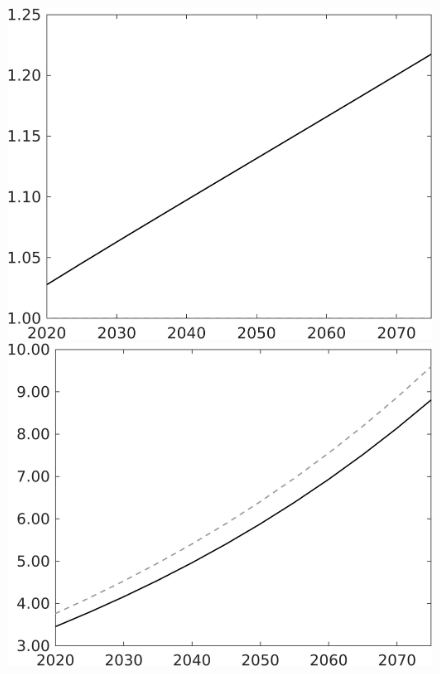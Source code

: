 \documentclass[12pt]{article}
\begin{document}
\begin{figure}[h!!]
\begin{minipage}[]{0.32\textwidth}
	\end{minipage}	
	\begin{minipage}[]{0.32\textwidth}
		\includegraphics[width=1\textwidth]{../../codding_model/own_basedOnFried/optimalPol_010922_revision/figures/all_13Sept22/CompTaul_Equlab_LFBAU_Reg0_lambdaa_spillover0_nsk1_xgr0_knspil0_sep1_countec0_GovRev0_etaa0.79_lgd0.png}
	\end{minipage}	
	\begin{minipage}[]{0.32\textwidth}
		\includegraphics[width=1\textwidth]{../../codding_model/own_basedOnFried/optimalPol_010922_revision/figures/all_13Sept22/CompTaul_Equlab_LFBAU_Reg0_Y_spillover0_nsk1_xgr0_knspil0_sep1_countec0_GovRev0_etaa0.79_lgd0.png}

\end{minipage}
\end{figure}
\end{document}

